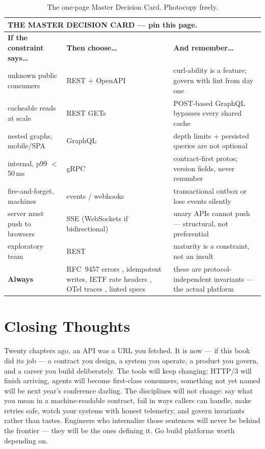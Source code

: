 \begin{table}[htbp]
  \centering
  \small
  \begin{tabularx}{\textwidth}{l X X}
    \toprule
    \multicolumn{3}{l}{\textbf{THE MASTER DECISION CARD --- pin this page.}} \\
    \midrule
    \textbf{If the constraint says\ldots} & \textbf{Then choose\ldots} & \textbf{And remember\ldots} \\
    \midrule
    unknown public consumers &
      REST + OpenAPI \cite{openapi31} &
      curl-ability is a feature; govern with lint from day one \\
    cacheable reads at scale &
      REST GETs \cite{rfc9110} &
      POST-based GraphQL bypasses every shared cache \\
    nested graphs, mobile/SPA &
      GraphQL \cite{graphqlspec} &
      depth limits + persisted queries are not optional \\
    internal, p99 $<$ 50\,ms &
      gRPC \cite{grpcdocs} &
      contract-first protos; version fields, never renumber \\
    fire-and-forget, machines &
      events / webhooks \cite{asyncapi} &
      transactional outbox or lose events silently \\
    server must push to browsers &
      SSE (WebSockets if bidirectional) &
      unary APIs cannot push --- structural, not preferential \\
    exploratory team &
      REST &
      maturity is a constraint, not an insult \\
    \midrule
    \textbf{Always} &
      RFC~9457 errors \cite{rfc9457}, idempotent writes, IETF rate headers
      \cite{ietf_ratelimit_headers}, OTel traces \cite{opentelemetrydocs},
      linted specs &
      these are protocol-independent invariants --- the actual platform \\
    \bottomrule
  \end{tabularx}
  \caption{The one-page Master Decision Card. Photocopy freely.}
  \label{tab:master-card}
\end{table}

\section{Closing Thoughts}

Twenty chapters ago, an API was a URL you fetched. It is now --- if this
book did its job --- a contract you design, a system you operate, a product
you govern, and a career you build deliberately. The tools will keep
changing: HTTP/3 will finish arriving, agents will become first-class
consumers, something not yet named will be next year's conference darling.
The disciplines will not change: say what you mean in a machine-readable
contract, fail in ways callers can handle, make retries safe, watch your
systems with honest telemetry, and govern invariants rather than tastes.
Engineers who internalize those sentences will never be behind the
frontier --- they will be the ones defining it. Go build platforms worth
depending on.


